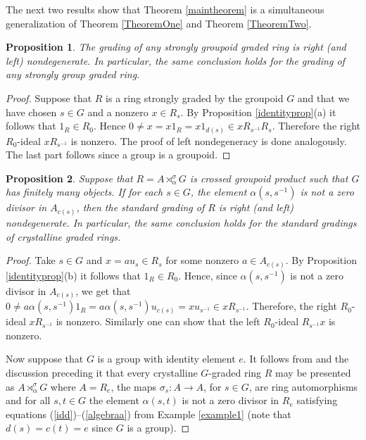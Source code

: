 \documentclass[11pt,leqno]{amsart}
\theoremstyle{plain}
\newtheorem{prop}{Proposition}
\theoremstyle{definition}
\begin{document}
$ $

The next two results show that Theorem \ref{maintheorem}
is a simultaneous generalization of Theorem \ref{TheoremOne}
and Theorem \ref{TheoremTwo}.

\begin{prop}
The grading of any strongly groupoid graded ring is right (and left) nondegenerate.
In particular, the same conclusion
holds for the grading of any strongly group graded ring.
\end{prop}

\begin{proof}
Suppose that $R$ is a ring strongly graded by the groupoid $G$
and that we have chosen $s \in G$ and a nonzero $x \in R_s$.
By Proposition \ref{identityprop}(a) it follows that $1_R \in R_0$.
Hence $0 \neq x = x 1_R = x 1_{d(s)} \in x R_{s^{-1}}R_s$.
Therefore the right $R_0$-ideal $x R_{s^{-1}}$ is nonzero.
The proof of left nondegeneracy is done analogously.
The last part follows since a group is a groupoid.
\end{proof}

\begin{prop}
Suppose that $R = A \rtimes^{\sigma}_{\alpha} G$ is
crossed groupoid product such that $G$
has finitely many objects. If for each $s \in G$,
the element $\alpha(s,s^{-1})$ is not a zero divisor
in $A_{c(s)}$, then the standard grading of $R$ is right (and left) nondegenerate.
In particular, the same conclusion holds for the standard gradings of
crystalline graded rings.
\end{prop}

\begin{proof}
Take $s \in G$ and $x = au_s \in R_s$ for some nonzero $a \in A_{c(s)}$.
By Proposition \ref{identityprop}(b) it follows
that $1_R \in R_0$.
Hence, since $\alpha(s,s^{-1})$ is not a zero divisor in $A_{c(s)}$,
we get that $0 \neq a \alpha(s,s^{-1}) 1_R =
a \alpha(s,s^{-1}) u_{c(s)} = x u_{s^{-1}} \in x R_{s^{-1}}$.
Therefore, the right $R_0$-ideal $x R_{s^{-1}}$ is nonzero. Similarly one can show that the left $R_0$-ideal $R_{s^{-1}}x$ is nonzero.

Now suppose that $G$ is a group with identity element $e$.
It follows from \cite[Corollary 1.7]{nauoyst} and the discussion
preceding it that every crystalline
$G$-graded ring $R$ may be presented as $A \rtimes_{\alpha}^{\sigma} G$
where $A = R_e$, the maps $\sigma_s : A \rightarrow A$,
for $s \in G$, are ring automorphisms and for all
$s,t \in G$ the element $\alpha(s,t)$ is not a zero divisor in $R_e$
satisfying equations (\ref{idd})--(\ref{algebraa})
from Example \ref{example1} (note that $d(s)=c(t)=e$
since $G$ is a group).
\end{proof}
\end{document}
